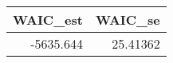 \begin{longtable}{rr}
\toprule
WAIC\_est & WAIC\_se \\ 
\midrule
-5635.644 & 25.41362 \\ 
\bottomrule
\end{longtable}

